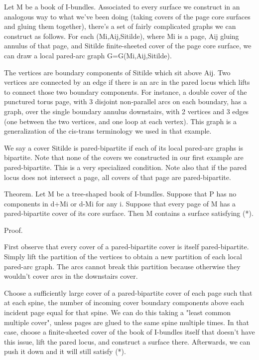 \documentclass[12pt]{amsart}
\theoremstyle{definition}
\begin{document}
Let M be a book of I-bundles. Associated to every surface we construct in an
analogous way to what we've been doing (taking covers of the page core surfaces
and gluing them together), there's a set of fairly complicated graphs we can
construct as follows. For each (Mi,Aij,Sitilde), where Mi is a page, Aij gluing
annulus of that page, and Sitilde finite-sheeted cover of the page core
surface, we can draw a local pared-arc graph G=G(Mi,Aij,Sitilde).

The vertices are boundary components of Sitilde which sit above Aij. Two
vertices are connected by an edge if there is an arc in the pared locus which
lifts to connect those two boundary components. For instance, a double cover of
the punctured torus page, with 3 disjoint non-parallel arcs on each boundary,
has a graph, over the single boundary annulus downstairs,  with 2 vertices and
3 edges (one between the two vertices, and one loop at each vertex). This graph
is a generalization of the cis-trans terminology we used in that example.

We say a cover Sitilde is pared-bipartite if each of its local pared-arc
graphs is bipartite. Note that none of the covers we constructed in our first
example are pared-bipartite. This is a very specialized condition. Note also
that if the pared locus does not intersect a page, all covers of that page are
pared-bipartite.

Theorem. Let M be a tree-shaped book of I-bundles. Suppose that P has no
components in d+Mi or d-Mi for any i. Suppose that every page of M has
a pared-bipartite cover of its core surface. Then M contains a surface
satisfying (*).

Proof.

First observe that every cover of a pared-bipartite cover is itself
pared-bipartite. Simply lift the partition of the vertices to obtain a new
partition of each local pared-arc graph. The arcs cannot break this
partition because otherwise they wouldn't cover arcs in the downstairs cover.

Choose a sufficiently large cover of a pared-bipartite cover of each page such
that at each spine, the number of incoming cover boundary components above each
incident page equal for that spine. We can do this taking a "least common
multiple cover", unless pages are glued to the same spine multiple times. In
that case, choose a finite-sheeted cover of the book of I-bundles itself that
doesn't have this issue, lift the pared locus, and construct a surface there.
Afterwards, we can push it down and it will still satisfy (*).
\end{document}
